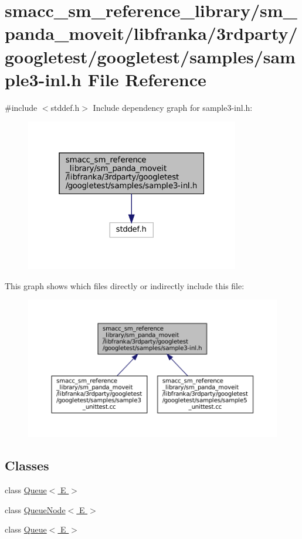 \hypertarget{sample3-inl_8h}{}\section{smacc\+\_\+sm\+\_\+reference\+\_\+library/sm\+\_\+panda\+\_\+moveit/libfranka/3rdparty/googletest/googletest/samples/sample3-\/inl.h File Reference}
\label{sample3-inl_8h}
{\ttfamily \#include $<$stddef.\+h$>$}\newline
Include dependency graph for sample3-\/inl.h\+:
\nopagebreak
\begin{figure}[H]
\begin{center}
\leavevmode
\includegraphics[width=265pt]{sample3-inl_8h__incl}
\end{center}
\end{figure}
This graph shows which files directly or indirectly include this file\+:
\nopagebreak
\begin{figure}[H]
\begin{center}
\leavevmode
\includegraphics[width=350pt]{sample3-inl_8h__dep__incl}
\end{center}
\end{figure}
\subsection*{Classes}
\begin{DoxyCompactItemize}
\item 
class \hyperlink{classQueue}{Queue$<$ E $>$}
\item 
class \hyperlink{classQueueNode}{Queue\+Node$<$ E $>$}
\item 
class \hyperlink{classQueue}{Queue$<$ E $>$}
\end{DoxyCompactItemize}
